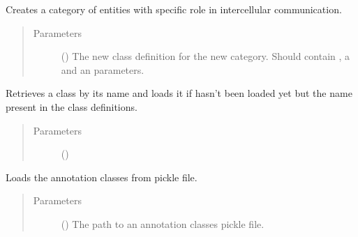 \documentclass[letterpaper,10pt,english]{sphinxmanual}
\begin{document}
\begin{fulllineitems}

\begin{fulllineitems}
\label{\detokenize{reference:pypath.annot.CustomAnnotation.create_class}}
Creates a category of entities with specific role in
intercellular communication.
\begin{quote}\begin{description}
\item[{Parameters}] \leavevmode
{} () \textendash{} The new class definition for the new category. Should
contain , a  and an 
parameters.

\end{description}\end{quote}

\end{fulllineitems}


\begin{fulllineitems}
\label{\detokenize{reference:pypath.annot.CustomAnnotation.get_class}}
Retrieves a class by its name and loads it if hasn’t been loaded
yet but the name present in the class definitions.
\begin{quote}\begin{description}
\item[{Parameters}] \leavevmode
{} () \textendash{} 

\end{description}\end{quote}

\end{fulllineitems}


\begin{fulllineitems}
\label{\detokenize{reference:pypath.annot.CustomAnnotation.load_from_pickle}}
Loads the annotation classes from pickle file.
\begin{quote}\begin{description}
\item[{Parameters}] \leavevmode
{} () \textendash{} The path to an annotation classes pickle file.


\end{description}
\end{quote}
\end{fulllineitems}
\end{fulllineitems}
\end{document}
